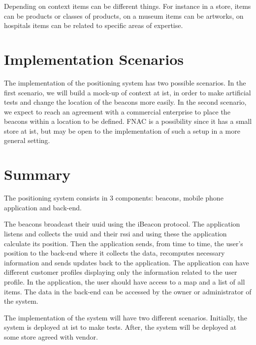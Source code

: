 Depending on context items can be different things. For instance in a store, items can be products or classes of products, on a museum items can be artworks, on hospitals items can be related to specific areas of expertise. 

\section{Implementation Scenarios}
\label{section:scenarios}
The implementation of the positioning system has two possible scenarios. In the first scenario, we will build a mock-up of context at \gls{ist}, in order to make artificial tests and change the location of the beacons more easily. In the second scenario, we expect to reach an agreement with a commercial enterprise to place the beacons within a location to be defined. FNAC is a possibility since it has a small store at \gls{ist}, but may be open to the implementation of such a setup in a more general setting.

\section{Summary}
\label{section:summary}

The positioning system consists in 3 components: beacons, mobile phone application and back-end. 

The beacons broadcast their \gls{uuid} using the iBeacon protocol. The application listens and collects the \gls{uuid} and their \gls{rssi} and using these the application calculate its position. Then the application sends, from time to time, the user's position to the back-end where it collects the data, recomputes necessary information and sends updates back to the application. The application can have different customer profiles displaying only the information related to the user profile. In the application, the user should have access to a map and a list of all items. The data in the back-end can be accessed by the owner or administrator of the system.

The implementation of the system will have two different scenarios. Initially, the system is deployed at \gls{ist} to make tests. After, the system will be deployed at some store agreed with vendor.